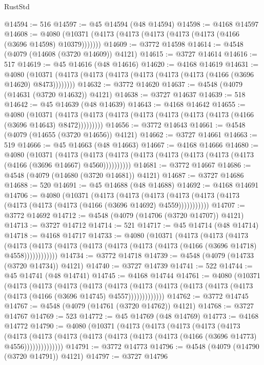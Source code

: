 \begin{lexlean}{RustStd}
\begin{coremodule}
@14594 := 516
@14597 := @45 @14594 (@48 @14594)
@14598 := @4168 @14597
@14608 := @4080 (@10371 (@4173 (@4173 (@4173 (@4173 (@4173 (@4166 (@3696 @14598) @10379)))))))
@14609 := @3772 @14598
@14614 := @4548 (@4079 (@14608 (@3720 @14609)) @4121)
@14615 := @3727 @14614
@14616 := 517
@14619 := @45 @14616 (@48 @14616)
@14620 := @4168 @14619
@14631 := @4080
    (@10371 (@4173 (@4173 (@4173 (@4173 (@4173 (@4173 (@4166 (@3696 @14620) @8473))))))))
@14632 := @3772 @14620
@14637 := @4548 (@4079 (@14631 (@3720 @14632)) @4121)
@14638 := @3727 @14637
@14639 := 518
@14642 := @45 @14639 (@48 @14639)
@14643 := @4168 @14642
@14655 := @4080
    (@10371 (@4173 (@4173 (@4173 (@4173 (@4173 (@4173 (@4173 (@4166 (@3696 @14643) @8472)))))))))
@14656 := @3772 @14643
@14661 := @4548 (@4079 (@14655 (@3720 @14656)) @4121)
@14662 := @3727 @14661
@14663 := 519
@14666 := @45 @14663 (@48 @14663)
@14667 := @4168 @14666
@14680 := @4080
    (@10371
      (@4173 (@4173 (@4173 (@4173 (@4173 (@4173 (@4173 (@4173 (@4166 (@3696 @14667) @4560))))))))))
@14681 := @3772 @14667
@14686 := @4548 (@4079 (@14680 (@3720 @14681)) @4121)
@14687 := @3727 @14686
@14688 := 520
@14691 := @45 @14688 (@48 @14688)
@14692 := @4168 @14691
@14706 := @4080
    (@10371
      (@4173
        (@4173
          (@4173 (@4173 (@4173 (@4173 (@4173 (@4173 (@4173 (@4166 (@3696 @14692) @4559)))))))))))
@14707 := @3772 @14692
@14712 := @4548 (@4079 (@14706 (@3720 @14707)) @4121)
@14713 := @3727 @14712
@14714 := 521
@14717 := @45 @14714 (@48 @14714)
@14718 := @4168 @14717
@14733 := @4080
    (@10371
      (@4173
        (@4173
          (@4173
            (@4173 (@4173 (@4173 (@4173 (@4173 (@4173 (@4173 (@4166 (@3696 @14718) @4558))))))))))))
@14734 := @3772 @14718
@14739 := @4548 (@4079 (@14733 (@3720 @14734)) @4121)
@14740 := @3727 @14739
@14741 := 522
@14744 := @45 @14741 (@48 @14741)
@14745 := @4168 @14744
@14761 := @4080
    (@10371
      (@4173
        (@4173
          (@4173
            (@4173
              (@4173
                (@4173 (@4173 (@4173 (@4173 (@4173 (@4173 (@4166 (@3696 @14745) @4557)))))))))))))
@14762 := @3772 @14745
@14767 := @4548 (@4079 (@14761 (@3720 @14762)) @4121)
@14768 := @3727 @14767
@14769 := 523
@14772 := @45 @14769 (@48 @14769)
@14773 := @4168 @14772
@14790 := @4080
    (@10371
      (@4173
        (@4173
          (@4173
            (@4173
              (@4173
                (@4173
                  (@4173
                    (@4173 (@4173 (@4173 (@4173 (@4173 (@4166 (@3696 @14773) @4556))))))))))))))
@14791 := @3772 @14773
@14796 := @4548 (@4079 (@14790 (@3720 @14791)) @4121)
@14797 := @3727 @14796

\end{coremodule}
\end{lexlean}
